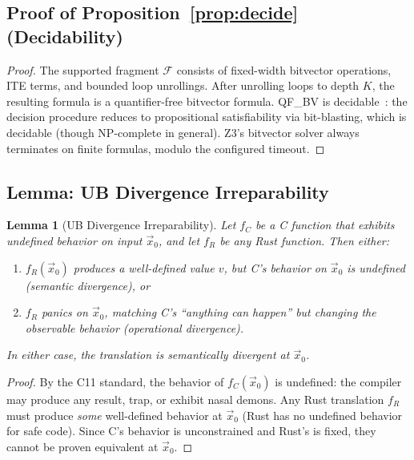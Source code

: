 \documentclass[11pt]{article}
\newtheorem{lemma}[theorem]{Lemma}
\newcommand{\qfbv}{\textsf{QF\_BV}}
\begin{document}
\subsection{Proof of Proposition~\ref{prop:decide} (Decidability)}

\begin{proof}
The supported fragment $\mathcal{F}$ consists of fixed-width bitvector
operations, ITE terms, and bounded loop unrollings.  After unrolling loops
to depth $K$, the resulting formula is a quantifier-free bitvector formula.
\qfbv{} is decidable~\cite{cbmc}: the decision procedure reduces to
propositional satisfiability via bit-blasting, which is decidable (though
NP-complete in general).  Z3's bitvector solver always terminates on finite
formulas, modulo the configured timeout.
\end{proof}

\subsection{Lemma: UB Divergence Irreparability}

\begin{lemma}[UB Divergence Irreparability]\label{lem:irreparable}
Let $f_C$ be a C function that exhibits undefined behavior on input
$\vec{x}_0$, and let $f_R$ be any Rust function.  Then either:
\begin{enumerate}[nosep]
\item $f_R(\vec{x}_0)$ produces a well-defined value $v$, but C's behavior
      on $\vec{x}_0$ is undefined (semantic divergence), or
\item $f_R$ panics on $\vec{x}_0$, matching C's ``anything can happen''
      but changing the observable behavior (operational divergence).
\end{enumerate}
In either case, the translation is semantically divergent at $\vec{x}_0$.
\end{lemma}

\begin{proof}
By the C11 standard, the behavior of $f_C(\vec{x}_0)$ is undefined: the
compiler may produce any result, trap, or exhibit nasal demons.
Any Rust translation $f_R$ must produce \emph{some} well-defined behavior
at $\vec{x}_0$ (Rust has no undefined behavior for safe code).  Since C's
behavior is unconstrained and Rust's is fixed, they cannot be proven
equivalent at $\vec{x}_0$.
\end{proof}

\end{document}
